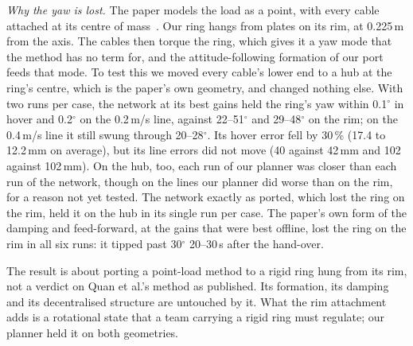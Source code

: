 \emph{Why the yaw is lost.} The paper models the load as a point, with every cable attached at its centre of
mass~\cite{quan2025swarm}. Our ring hangs from plates on its rim, at 0.225\,m from the axis. The cables then torque the
ring, which gives it a yaw mode that the method has no term for, and the attitude-following formation of our port
feeds that mode. To test this we moved every cable's lower end to a hub at the ring's centre, which is the paper's own
geometry, and changed nothing else. With two runs per case, the network at its best gains held the ring's yaw within 0.1$^\circ$ in hover and
0.2$^\circ$ on the 0.2\,m/s line, against 22--51$^\circ$ and 29--48$^\circ$ on the rim; on the 0.4\,m/s line it
still swung through 20--28$^\circ$. Its hover error fell by 30\,\% (17.4 to 12.2\,mm on average), but its line errors
did not move (40 against 42\,mm and 102 against 102\,mm). On the hub, too, each run of our planner was closer than each
run of the network, though on the lines our planner did worse than on the rim, for a reason not yet tested. The
network exactly as ported, which lost the ring on the rim, held it on the hub in its single run per case. The paper's
own form of the damping and feed-forward, at the gains that were best offline, lost the ring on the rim in all six
runs: it tipped past 30$^\circ$ 20--30\,s after the hand-over.

The result is about porting a point-load method to a rigid ring hung from its rim, not a verdict on Quan et al.'s
method as published. Its formation, its damping and its decentralised structure are untouched by it. What the rim
attachment adds is a rotational state that a team carrying a rigid ring must regulate; our planner held it on both
geometries.

